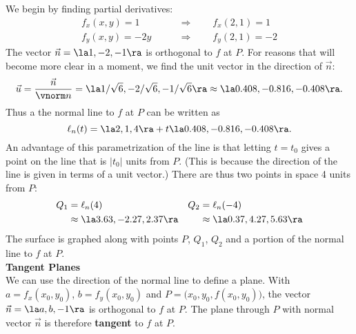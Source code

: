 {We begin by finding partial derivatives:
\begin{align*}
f_x(x,y)  =1  \qquad &\Rightarrow \qquad f_x(2,1) = 1\\
f_y(x,y) = -2y \qquad &\Rightarrow \qquad  f_y(2,1) = -2
\end{align*}
The vector $\vec n=\la 1,-2,-1\ra$ is orthogonal to $f$ at $P$. For reasons that will become more clear in a moment, we find the unit vector in the direction of $\vec n$:
$$\vec u = \frac{\vec n}{\vnorm n} = \la 1/\sqrt{6},-2/\sqrt{6},-1/\sqrt{6}\ra \approx \la 0.408,-0.816,-0.408\ra.$$
Thus a the normal line to $f$ at $P$ can be written as
$$\ell_n(t) = \la 2,1,4\ra + t\la  0.408,-0.816,-0.408 \ra.$$
An advantage of this parametrization of the line is that letting $t=t_0$ gives a point on the line that is $|t_0|$ units from $P$. (This is because the direction of the line is given in terms of a unit vector.) There are thus two points in space 4 units from $P$:
\begin{align*}
Q_1 &= \ell_n(4) & Q_2 &= \ell_n(-4) \\
  &\approx \la 3.63, -2.27, 2.37\ra & & \approx\la 0.37, 4.27, 5.63\ra
	\end{align*}
The surface is graphed along with points $P$, $Q_1$, $Q_2$ and a portion of the normal line to $f$ at $P$.
}\\

\noindent\textbf{\large Tangent Planes}\\

We can use the direction of the normal line to define a plane. With $a=f_x(x_0,y_0)$, $b=f_y(x_0,y_0)$ and $P = \big(x_0,y_0,f(x_0,y_0)\big)$, the vector $\vec n=\la a,b,-1\ra$ is orthogonal to $f$ at $P$. The plane through $P$ with normal vector $\vec n$ is therefore \textbf{tangent} to $f$ at $P$.

